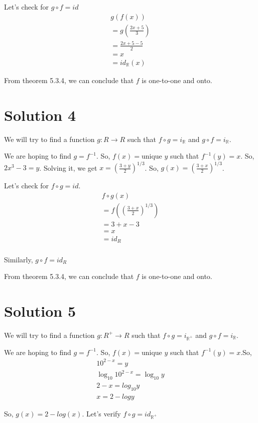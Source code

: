 \documentclass{article}
\begin{document}
Let's check for $g \circ f = id $
\begin{align*}
  g(f(x)) \\
  = g(\frac{2x + 5}{3}) \\
  = \frac{2x + 5 - 5}{2} \\
  = x \\
  = id_{\mathbb{R}}(x)
\end{align*}

From theorem 5.3.4, we can conclude that $f$ is one-to-one and onto.

\section{Solution 4}
We will try to find a function $g: R \to R$ such that $f \circ g =
i_\mathbb{R}$ and $g \circ f = i_\mathbb{R}$.

We are hoping to find $g = f^{-1}$. So, $f(x) = \text{unique }y$ such
that $f^{-1}(y) = x$. So, $2x^3 - 3 = y$. Solving it, we get
$x = (\frac{3+y}{2})^{1/3}$. So, $g(x) = (\frac{3+x}{2})^{1/3}$.

Let's check for $f \circ g = id$.
\begin{align*}
  f \circ g(x) \\
  = f((\frac{3+x}{2})^{1/3}) \\
  = 3 + x - 3 \\
  = x \\
  = id_R \\
\end{align*}

Similarly, $g \circ f = id_R$

From theorem 5.3.4, we can conclude that $f$ is one-to-one and onto.

\section{Solution 5}
We will try to find a function $g: R^{+} \to R$ such that $f \circ g =
i_\mathbb{R^{+}}$ and $g \circ f = i_\mathbb{R}$.

We are hoping to find $g = f^{-1}$. So, $f(x) = \text{unique }y$ such
that $f^{-1}(y) = x$.So,
\begin{align*}
  10^{2-x} = y \\
  \log_{10}10^{2-x} = \log_{10}y \\
  2 - x = log_{10}y \\
  x = 2 - log y
\end{align*}

So, $g(x) = 2 - log(x)$. Let's verify $f \circ g = id_{\mathbb{R^{+}}}$
\end{document}
